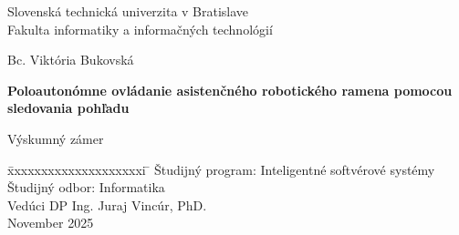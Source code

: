\begin{titlepage}
\newlength{\myind}
\addtolength{\myind}{57mm}

\newlength{\myrulelength}
\addtolength{\myrulelength}{.6\marginparwidth}
\addtolength{\myrulelength}{\textwidth}
\newcommand{\myrule}{\parbox{\myrulelength}{\hrulefill}}
\newcommand{\mybox}[1]{\parbox{\myrulelength}{#1}}
\newcommand{\mycbox}[1]{\parbox{\myrulelength}{\centering #1}}

\centering
\hspace{2cm} Slovenská technická univerzita v Bratislave\\
\hspace{2cm} Fakulta informatiky a informačných technológií

\vspace{1mm}
\myrule

\vspace{55mm}

\mycbox{Bc. Viktória Bukovská}

\vspace{10mm}

\mycbox{\LARGE \textbf{Poloautonómne ovládanie asistenčného robotického ramena pomocou sledovania pohľadu}}

\vspace{10mm}
\mycbox{\large Výskumný zámer}

\vspace{10mm}


\vfill

\begin{tabbing}
    \=xxxxxxxxxxxxxxxxxxxxi \=\kill
    \> Študijný program:    \> Inteligentné softvérové systémy\\
    \> Študijný odbor:      \> Informatika\\
    \> Vedúci DP            \> Ing. Juraj Vincúr, PhD.  \\
    \> November 2025        \> 
\end{tabbing}

\end{titlepage}
